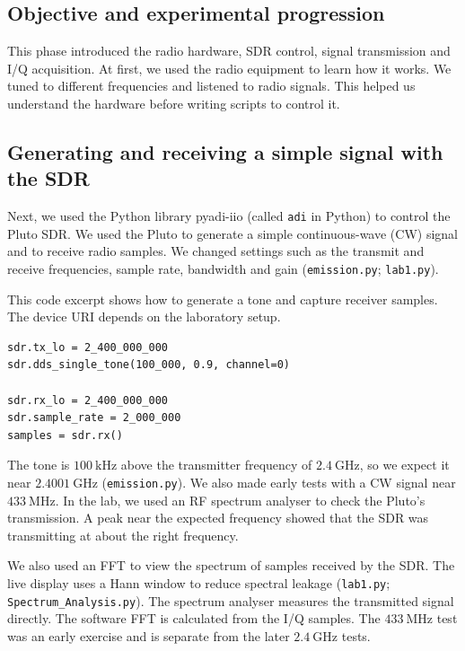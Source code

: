 \subsection{Objective and experimental progression}

This phase introduced the radio hardware, SDR control, signal transmission
and I/Q acquisition. At first, we used the radio equipment to learn how it
works. We tuned to different frequencies and listened to radio signals. This
helped us understand the hardware before writing scripts to control it.

\subsection{Generating and receiving a simple signal with the SDR}

Next, we used the Python library pyadi-iio (called \texttt{adi} in Python) to
control the Pluto SDR. We used the Pluto to generate a simple continuous-wave
(CW) signal and to receive radio samples. We changed settings such as the
transmit and receive frequencies, sample rate, bandwidth and gain
(\texttt{emission.py}; \texttt{lab1.py}).

This code excerpt shows how to generate a tone and capture receiver samples.
The device URI depends on the laboratory setup.

\begin{verbatim}
sdr.tx_lo = 2_400_000_000
sdr.dds_single_tone(100_000, 0.9, channel=0)

sdr.rx_lo = 2_400_000_000
sdr.sample_rate = 2_000_000
samples = sdr.rx()
\end{verbatim}

The tone is \(100~\mathrm{kHz}\) above the transmitter frequency of
\(2.4~\mathrm{GHz}\), so we expect it near \(2.4001~\mathrm{GHz}\)
(\texttt{emission.py}). We also made early tests with a CW signal near
\(433~\mathrm{MHz}\). In the lab, we used an RF spectrum analyser to check the
Pluto's transmission. A peak near the expected frequency showed that the SDR
was transmitting at about the right frequency.

We also used an FFT to view the spectrum of samples received by the SDR. The
live display uses a Hann window to reduce spectral leakage
(\texttt{lab1.py}; \texttt{Spectrum\_Analysis.py}). The spectrum analyser
measures the transmitted signal directly. The software FFT is calculated from
the I/Q samples. The \(433~\mathrm{MHz}\) test was an early exercise and is
separate from the later \(2.4~\mathrm{GHz}\) tests.

